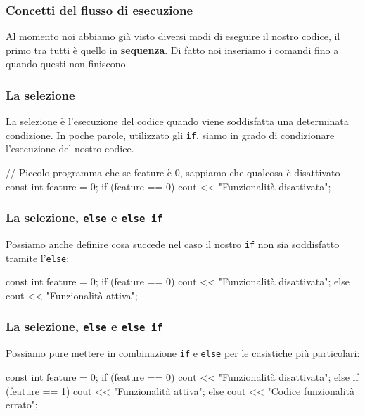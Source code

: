 \documentclass[handout]{beamer}
\begin{document}
    \begin{frame}
        \frametitle{Concetti del flusso di esecuzione}
        Al momento noi abbiamo già visto diversi modi di eseguire il nostro codice, il primo tra tutti è quello in \textbf{sequenza}. Di fatto noi inseriamo i comandi fino a quando questi non finiscono.
    \end{frame}

    \begin{frame}[fragile]
        \frametitle{La selezione}
        La selezione è l'esecuzione del codice quando viene soddisfatta una determinata condizione. In poche parole, utilizzato gli \texttt{if}, siamo in grado di condizionare l'esecuzione del nostro codice.
        \begin{cppcode}
            // Piccolo programma che se feature è 0, sappiamo che qualcosa è disattivato
            const int feature = 0;
            if (feature == 0) {
                cout << "Funzionalità disattivata";
            }
        \end{cppcode}
    \end{frame}

    \begin{frame}[fragile]
        \frametitle{La selezione, \texttt{else} e \texttt{else if}}
        Possiamo anche definire cosa succede nel caso il nostro \texttt{if} non sia soddisfatto tramite l'\texttt{else}:
        \begin{cppcode}
            const int feature = 0;
            if (feature == 0) {
                cout << "Funzionalità disattivata";
            } else {
                cout << "Funzionalità attiva";
            }
        \end{cppcode}
    \end{frame}

    \begin{frame}[fragile]
        \frametitle{La selezione, \texttt{else} e \texttt{else if}}
        Possiamo pure mettere in combinazione \texttt{if} e \texttt{else} per le casistiche più particolari:
        \begin{cppcode}
            const int feature = 0;
            if (feature == 0) {
                cout << "Funzionalità disattivata";
            } else if (feature == 1) {
                cout << "Funzionalità attiva";
            } else {
                cout << "Codice funzionalità errato";
            }
        \end{cppcode}
    \end{frame}
\end{document}
